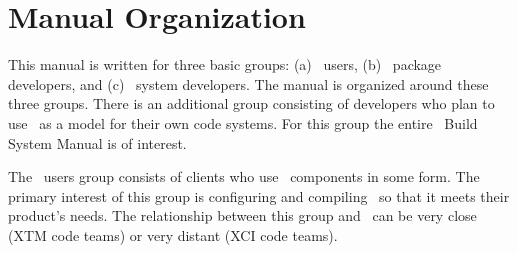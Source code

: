 
\section{Manual Organization}

This manual is written for three basic groups: (a) \draco\ users, (b)
\draco\ package developers, and (c) \draco\ system developers. The
manual is organized around these three groups. There is an additional
group consisting of developers who plan to use \draco\ as a model for
their own code systems.  For this group the entire \draco\ Build
System Manual is of interest.

The \draco\ users group consists of clients who use \draco\ components
in some form.  The primary interest of this group is configuring and
compiling \draco\ so that it meets their product's needs.  The
relationship between this group and \draco\ can be very close (XTM
code teams) or very distant (XCI code teams).

